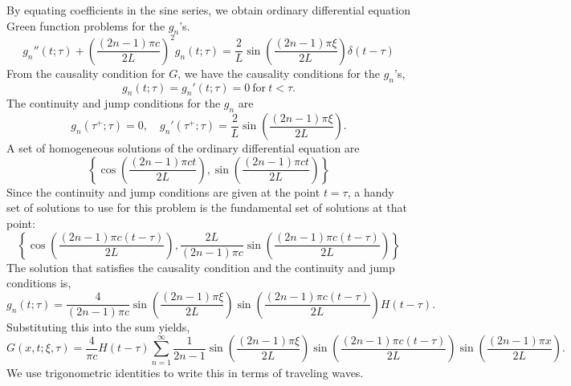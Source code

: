 {\begin{Solution}
  By equating coefficients in the sine series, we obtain ordinary differential
  equation Green function problems for the $g_n$'s.
  \[
  g_n''(t;\tau) + \left( \frac{(2 n - 1) \pi c}{2 L} \right)^2 g_n(t; \tau)
  = \frac{2}{L} \sin \left( \frac{(2 n - 1) \pi \xi}{2 L} \right)
  \delta(t - \tau)
  \]
  From the causality condition for $G$, we have the causality conditions for 
  the $g_n$'s,
  \[
  g_n(t; \tau) = g_n'(t; \tau) = 0\ \mathrm{for}\ t < \tau.
  \]
  The continuity and jump conditions for the $g_n$ are
  \[
  g_n(\tau^+; \tau) = 0, \quad g_n'(\tau^+; \tau) = 
  \frac{2}{L} \sin \left( \frac{(2 n - 1) \pi \xi}{2 L} \right).
  \]
  A set of homogeneous solutions of the ordinary differential equation are
  \[
  \left\{
    \cos \left( \frac{(2 n - 1) \pi c t}{2 L} \right),
    \sin \left( \frac{(2 n - 1) \pi c t}{2 L} \right)
  \right\}
  \]
  Since the continuity and jump conditions are given at the point $t = \tau$,
  a handy set of solutions to use for this problem is the fundamental set
  of solutions at that point:
  \[
  \left\{
    \cos \left( \frac{(2 n - 1) \pi c (t - \tau)}{2 L} \right),
    \frac{2 L}{(2 n - 1) \pi c}
    \sin \left( \frac{(2 n - 1) \pi c (t - \tau)}{2 L} \right)
  \right\}
  \]
  The solution that satisfies the causality condition and the continuity and 
  jump conditions is,
  \[
  g_n(t; \tau) = 
  \frac{4}{(2 n - 1) \pi c} \sin \left( \frac{(2 n - 1) \pi \xi}{2 L} \right)
  \sin \left( \frac{(2 n - 1) \pi c (t - \tau)}{2 L} \right)
  H(t - \tau).
  \]
  Substituting this into the sum yields,
  \[
  G(x, t; \xi, \tau) = \frac{4}{\pi c} H(t - \tau) \sum_{n = 1}^\infty 
  \frac{1}{2 n - 1} \sin \left( \frac{(2 n - 1) \pi \xi}{2 L} \right)
  \sin \left( \frac{(2 n - 1) \pi c (t - \tau)}{2 L} \right)
  \sin \left( \frac{(2 n - 1) \pi x}{2 L} \right).
  \]
  We use trigonometric identities to write this in terms of traveling waves.

  \begin{center}
  \end{center}


\end{Solution}}
